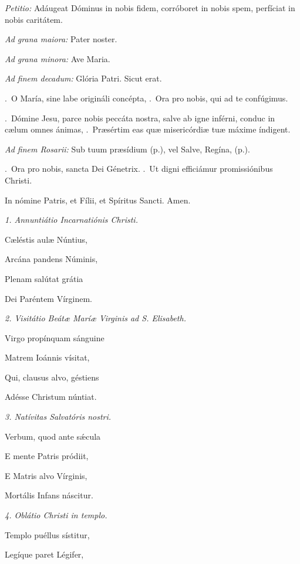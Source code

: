 \documentclass[12pt,a6paper]{book}
\makeatletter
\DeclareRobustCommand{\V}{\textbf{\vers@resp{-0.1em}{V}}.~}
\DeclareRobustCommand{\R}{\textbf{\vers@resp{0pt}{R}}.~}
\newcommand{\vers@resp@sym}{\raisebox{0.2ex}{\rotatebox[origin=c]{-20}{$\m@th\rceil$}}}
\newcommand{\vers@resp}[2]{%
  {\ooalign{\hidewidth\kern#1\vers@resp@sym\hidewidth\cr#2\cr}}%
}
\makeatother
\begin{document}
\begin{sloppy}
\textit{Petitio:} Adáugeat Dóminus in nobis fidem, corróboret in nobis spem, perfíciat in nobis caritátem.

\textit{Ad grana maiora:} Pater noster.

\textit{Ad grana minora:} Ave Maria.

\textit{Ad finem decadum:} {Glória Patri. Sicut erat.}

\V O María, sine labe origináli concépta, 
\R Ora pro nobis, qui ad te confúgimus.

\V Dómine Jesu, parce nobis peccáta nostra, salve ab igne inférni, conduc in cælum omnes ánimas, 
\R Præsértim eas quæ misericórdiæ tuæ máxime índigent.

\textit{Ad finem Rosarii:} Sub tuum præsídium (p.\pageref{sub_tuum}), vel Salve, Regína, (p.\pageref{salve_regina}). 

\V Ora pro nobis,  sancta Dei Génetrix. 
\R Ut digni efficiámur promissiónibus Christi.

In nómine Patris, et Fílii, et Spíritus Sancti. Amen.

\textit{1. Annuntiátio Incarnatiónis Christi.}

Cæléstis aulæ Núntius,

Arcána pandens Núminis,

Plenam salútat grátia

Dei Paréntem Vírginem.

\vspace{3mm}

\textit{2. Visitátio Beátæ Maríæ Virginis ad S. Elisabeth.}

Virgo propínquam sánguine

Matrem Ioánnis vísitat,

Qui, clausus alvo, géstiens

Adésse Christum núntiat.

\vspace{3mm}

\textit{3. Natívitas Salvatóris nostri.}

Verbum, quod ante sǽcula

E mente Patris pródiit,

E Matris alvo Vírginis,

Mortális Infans náscitur. 

\vspace{3mm}

\textit{4. Oblátio Christi in templo.}

Templo puéllus sístitur,

Legíque paret Légifer,


\end{sloppy}
\end{document}
